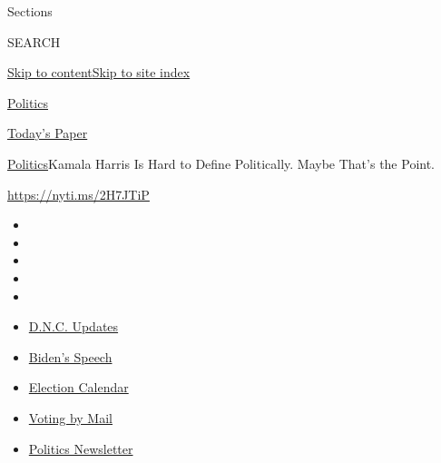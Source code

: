 Sections

SEARCH

\protect\hyperlink{site-content}{Skip to
content}\protect\hyperlink{site-index}{Skip to site index}

\href{https://www.nytimes3xbfgragh.onion/section/politics}{Politics}

\href{https://myaccount.nytimes3xbfgragh.onion/auth/login?response_type=cookie\&client_id=vi}{}

\href{https://www.nytimes3xbfgragh.onion/section/todayspaper}{Today's
Paper}

\href{/section/politics}{Politics}\textbar{}Kamala Harris Is Hard to
Define Politically. Maybe That's the Point.

\url{https://nyti.ms/2H7JTiP}

\begin{itemize}
\item
\item
\item
\item
\item
\end{itemize}

\begin{itemize}
\item
  \href{https://www.nytimes3xbfgragh.onion/live/2020/08/20/us/dnc-convention-election?action=click\&pgtype=Article\&state=default\&region=TOP_BANNER\&context=storylines_menu}{D.N.C.
  Updates}
\item
  \href{https://www.nytimes3xbfgragh.onion/2020/08/20/us/politics/biden-presidential-nomination-dnc.html?action=click\&pgtype=Article\&state=default\&region=TOP_BANNER\&context=storylines_menu}{Biden's
  Speech}
\item
  \href{https://www.nytimes3xbfgragh.onion/interactive/2019/us/elections/2020-presidential-election-calendar.html?action=click\&pgtype=Article\&state=default\&region=TOP_BANNER\&context=storylines_menu}{Election
  Calendar}
\item
  \href{https://www.nytimes3xbfgragh.onion/interactive/2020/08/11/us/politics/vote-by-mail-us-states.html?action=click\&pgtype=Article\&state=default\&region=TOP_BANNER\&context=storylines_menu}{Voting
  by Mail}
\item
  \href{https://www.nytimes3xbfgragh.onion/newsletters/politics?action=click\&pgtype=Article\&state=default\&region=TOP_BANNER\&context=storylines_menu}{Politics
  Newsletter}
\end{itemize}

